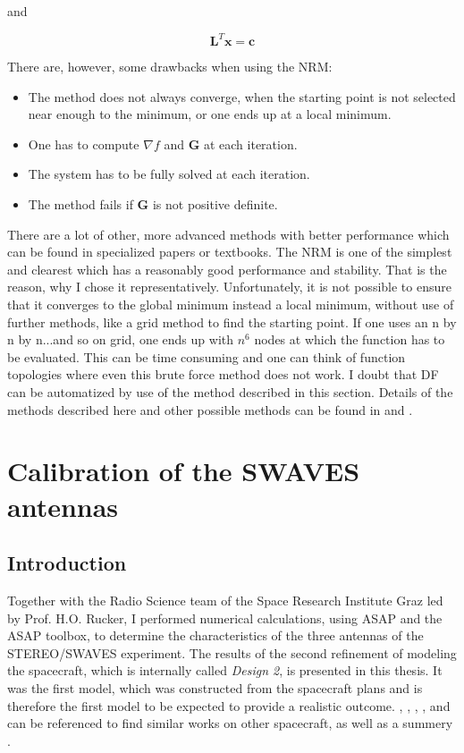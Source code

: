 \documentclass[a4paper,14pt]{extbook}
\begin{document}
and

\begin{equation}
\textbf{L}^T \textbf{x}=\textbf{c}
\end{equation}

There are, however, some drawbacks when using the NRM:

\begin{itemize}
\item The method does not always converge, when the starting point is not selected near enough to the minimum, or one ends up at a local minimum.
\item One has to compute $\nabla f$ and $\textbf{G}$ at each iteration.
\item The system has to be fully solved at each iteration.
\item The method fails if \textbf{G} is not positive definite.
\end{itemize}

There are a lot of other, more advanced methods with better performance which can be found in specialized papers or textbooks. The NRM is one of the simplest and clearest which has a reasonably good performance and stability. That is the reason, why I chose it representatively. Unfortunately, it is not possible to ensure that it converges to the global minimum instead a local minimum, without use of further methods, like a grid method to find the starting point. If one uses an n by n by n...and so on grid, one ends up with $n^6$ nodes at which the function has to be evaluated. This can be time consuming and one can think of function topologies where even this brute force method does not work. I doubt that DF can be automatized by use of the method described in this section. Details of the methods described here and other possible methods can be found in \cite{burdenfaires} and \cite{recipes}.

\chapter{Calibration of the SWAVES antennas}
\section{Introduction}

Together with the Radio Science team of the Space Research Institute Graz led by Prof. H.O. Rucker, I performed numerical calculations, using ASAP and the ASAP toolbox, to determine the characteristics of the three antennas of the STEREO/SWAVES experiment. The results of the second refinement of modeling the spacecraft, which is internally called \emph{Design 2}, is presented in this thesis. It was the first model, which was constructed from the spacecraft plans and is therefore the first model to be expected to provide a realistic outcome. \cite{vogl_01}, \cite{vogl_04}, \cite{cassini2}, \cite{cassini3}, \cite{cassini} \cite{marsis} and \\
\cite{marsis2} can be referenced to find similar works on other spacecraft, as well as a summery \cite{ruckerundi05}.
\end{document}

